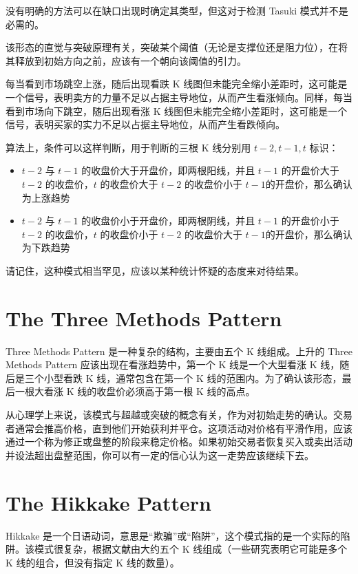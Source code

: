 没有明确的方法可以在缺口出现时确定其类型，但这对于检测 Tasuki 模式并不是必需的。


该形态的直觉与突破原理有关，突破某个阈值（无论是支撑位还是阻力位），在将其释放到初始方向之前，应该有一个朝向该阈值的引力。

每当看到市场跳空上涨，随后出现看跌 K 线图但未能完全缩小差距时，这可能是一个信号，表明卖方的力量不足以占据主导地位，从而产生看涨倾向。同样，每当看到市场向下跳空，随后出现看涨 K 线图但未能完全缩小差距时，这可能是一个信号，表明买家的实力不足以占据主导地位，从而产生看跌倾向。

算法上，条件可以这样判断，用于判断的三根 K 线分别用 $t-2,t-1,t$ 标识：
\begin{itemize}
    \item $t-2$ 与 $t-1$ 的收盘价大于开盘价，即两根阳线，并且 $t-1$ 的开盘价大于 $t-2$ 的收盘价，$t$ 的收盘价大于 $t-2$ 的收盘价小于 $t-1$的开盘价，那么确认为上涨趋势
    \item $t-2$ 与 $t-1$ 的收盘价小于开盘价，即两根阴线，并且 $t-1$ 的开盘价小于 $t-2$ 的收盘价，$t$ 的收盘价小于 $t-2$ 的收盘价大于 $t-1$的开盘价，那么确认为下跌趋势
\end{itemize}

请记住，这种模式相当罕见，应该以某种统计怀疑的态度来对待结果。
\section{The Three Methods Pattern}
Three Methods Pattern 是一种复杂的结构，主要由五个 K 线组成。上升的 Three Methods Pattern 应该出现在看涨趋势中，第一个 K 线是一个大型看涨 K 线，随后是三个小型看跌 K 线，通常包含在第一个 K 线的范围内。为了确认该形态，最后一根大看涨 K 线的收盘价必须高于第一根 K 线的高点。

从心理学上来说，该模式与超越或突破的概念有关，作为对初始走势的确认。交易者通常会推高价格，直到他们开始获利并平仓。这项活动对价格有平滑作用，应该通过一个称为修正或盘整的阶段来稳定价格。如果初始交易者恢复买入或卖出活动并设法超出盘整范围，你可以有一定的信心认为这一走势应该继续下去。
\section{The Hikkake Pattern}
Hikkake 是一个日语动词，意思是“欺骗”或“陷阱”，这个模式指的是一个实际的陷阱。该模式很复杂，根据文献由大约五个 K 线组成（一些研究表明它可能是多个 K 线的组合，但没有指定 K 线的数量）。

